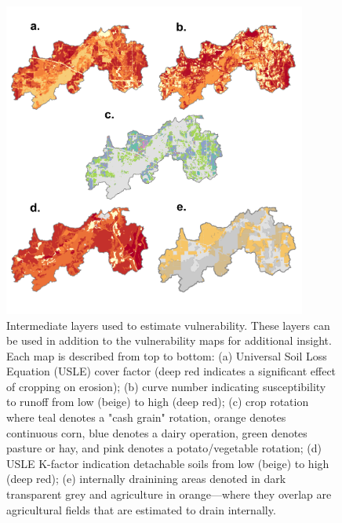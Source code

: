 \documentclass[12pt]{article}
\begin{document}
\begin{figure}
  \centering
    \includegraphics[width=0.89\textwidth]{intermediateLayers}
  \caption{Intermediate layers used to estimate vulnerability. These layers can be used in addition to the vulnerability maps for additional insight. Each map is described from top to bottom: (a) Universal Soil Loss Equation (USLE) cover factor (deep red indicates a significant effect of cropping on erosion); (b) curve number indicating susceptibility to runoff from low (beige) to high (deep red); (c) crop rotation where teal denotes a "cash grain" rotation, orange denotes continuous corn, blue denotes a dairy operation, green denotes pasture or hay, and pink denotes a potato/vegetable rotation; (d) USLE K-factor indication detachable soils from low (beige) to high (deep red); (e) internally drainining areas denoted in dark transparent grey and agriculture in orange---where they overlap are agricultural fields that are estimated to drain internally.}
  \label{intermediateLayers}
\end{figure}

\pagebreak



\end{document}
